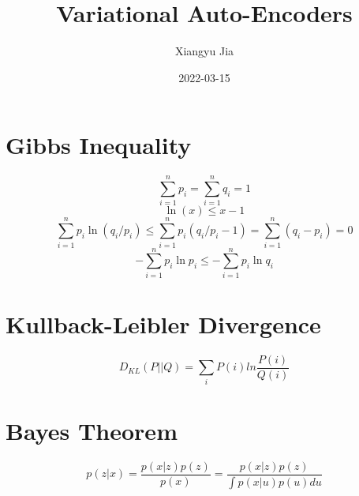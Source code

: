 \documentclass{article}
\title{Variational Auto-Encoders}
\date{2022-03-15}
\author{Xiangyu Jia}
\begin{document}
\maketitle
\newpage
{}

\section{Gibbs Inequality}
\begin{equation}
    \sum_{i=1}^{n}p_{i}=\sum_{i=1}^{n}q_{i}=1
\end{equation}
\begin{equation}
    \ln(x)\le x-1
\end{equation}
\begin{equation}
    \sum_{i=1}^{n}p_{i}\ln(q_{i}/p_{i})\le \sum_{i=1}^{n}p_{i}(q_{i}/p_{i}-1)=\sum_{i=1}^{n}(q_{i}-p_{i})=0
\end{equation}
\begin{equation}
    -\sum_{i=1}^{n}p_{i}\ln p_{i}\le -\sum_{i=1}^{n}p_{i}\ln q_{i}
\end{equation}

\section{Kullback-Leibler Divergence}
\begin{equation}
D_{KL}(P||Q)=\sum_{i}P(i)ln\frac{P(i)}{Q(i)}
\end{equation}

\section{Bayes Theorem}
\begin{equation}
p(z|x)=\frac{p(x|z)p(z)}{p(x)}=\frac{p(x|z)p(z)}{\int p(x|u)p(u)du}
\end{equation}
\end{document}
